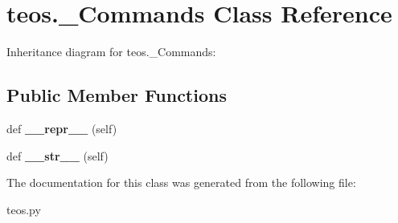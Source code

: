 \hypertarget{classteos_1_1__Commands}{}\section{teos.\+\_\+\+Commands Class Reference}
\label{classteos_1_1__Commands}


Inheritance diagram for teos.\+\_\+\+Commands\+:
\subsection*{Public Member Functions}
\begin{DoxyCompactItemize}
\item 
\mbox{\label{classteos_1_1__Commands_a10681011f42df9e010cc7b1497fa0940}} 
def {\bfseries \+\_\+\+\_\+repr\+\_\+\+\_\+} (self)
\item 
\mbox{\label{classteos_1_1__Commands_a63201a6faac69dae2c75e53577973781}} 
def {\bfseries \+\_\+\+\_\+str\+\_\+\+\_\+} (self)
\end{DoxyCompactItemize}


The documentation for this class was generated from the following file\+:\begin{DoxyCompactItemize}
\item 
teos.\+py\end{DoxyCompactItemize}
